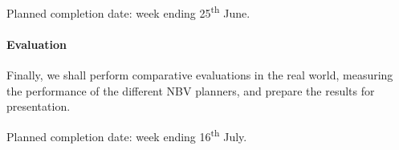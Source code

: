 \documentclass[a4paper,11pt,english]{article}
\begin{document}
Planned completion date: week ending 25\textsuperscript{th} June.

\paragraph{Evaluation}
Finally, we shall perform comparative evaluations in the real world, measuring the performance of the different NBV planners, and prepare the results for presentation.

Planned completion date: week ending 16\textsuperscript{th} July.

\begin{landscape}


\end{landscape}
\end{document}

